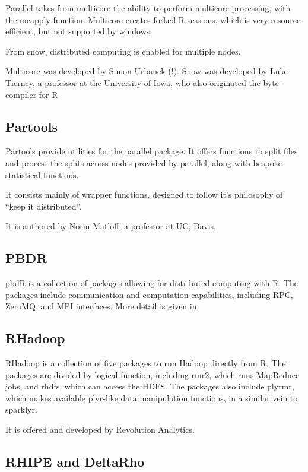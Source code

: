 \documentclass[10pt,a4paper]{article}
\begin{document}
Parallel takes from multicore the ability to perform multicore
processing, with the mcapply function. Multicore creates forked R
sessions, which is very resource-efficient, but not supported by
windows.

From snow, distributed computing is enabled for multiple nodes.

Multicore was developed by Simon Urbanek (!). Snow was developed by
Luke Tierney, a professor at the University of Iowa, who also
originated the byte-compiler for R

\subsection{Partools}
\label{sec:partools}

Partools provide utilities for the parallel
package\cite{matloff16:_softw_alchem}. It offers functions to split
files and process the splits across nodes provided by parallel, along
with bespoke statistical functions.

It consists mainly of wrapper functions, designed to follow it's
philosophy of ``keep it distributed''.

It is authored by Norm Matloff, a professor at UC, Davis.

\subsection{PBDR}
\label{sec:pbdr}


pbdR is a collection of packages allowing for distributed computing
with R\cite{pbdBASEpackage}. The packages include communication and
computation capabilities, including RPC, ZeroMQ, and MPI interfaces.
More detail is given in \textcite{pbdBASEvignette}

\subsection{RHadoop}
\label{sec:rhadoop}

RHadoop is a collection of five packages to run Hadoop directly from
R\textcite{analytics:_rhadoop_wiki}. The packages are divided by
logical function, including rmr2, which runs MapReduce jobs, and
rhdfs, which can access the HDFS. The packages also include plyrmr,
which makes available plyr-like data manipulation functions, in a
similar vein to sparklyr.

It is offered and developed by Revolution Analytics.
  
\subsection{RHIPE and DeltaRho}
\label{sec:rhipe-deltarho}
\end{document}
